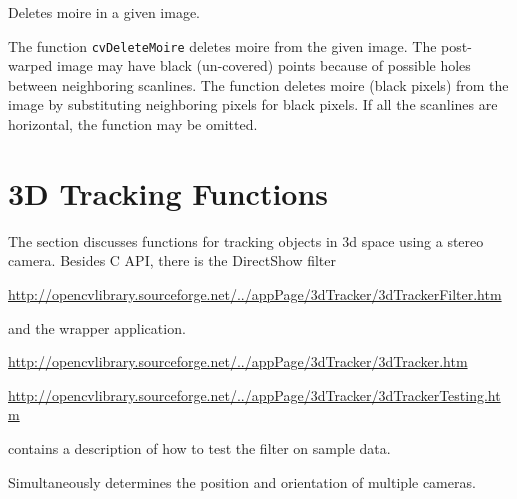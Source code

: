 
Deletes moire in a given image.


\begin{description}
\end{description}

The function \texttt{cvDeleteMoire} deletes moire from the given image. The post-warped image may have black (un-covered) points because of possible holes between neighboring scanlines. The function deletes moire (black pixels) from the image by substituting neighboring pixels for black pixels. If all the scanlines are horizontal, the function may be omitted.

\section{3D Tracking Functions} %

The section discusses functions for tracking objects in 3d space using a stereo camera. Besides C API, there is the DirectShow filter

\href{http://opencvlibrary.sourceforge.net/../appPage/3dTracker/3dTrackerFilter.htm}{http://opencvlibrary.sourceforge.net/../appPage/3dTracker/3dTrackerFilter.htm}

and the wrapper application.

\href{http://opencvlibrary.sourceforge.net/../appPage/3dTracker/3dTracker.htm}{http://opencvlibrary.sourceforge.net/../appPage/3dTracker/3dTracker.htm}

\href{http://opencvlibrary.sourceforge.net/../appPage/3dTracker/3dTrackerTesting.htm}{http://opencvlibrary.sourceforge.net/../appPage/3dTracker/3dTrackerTesting.htm} 

contains a description of how to test the filter on sample data.


Simultaneously determines the position and orientation of multiple cameras.


